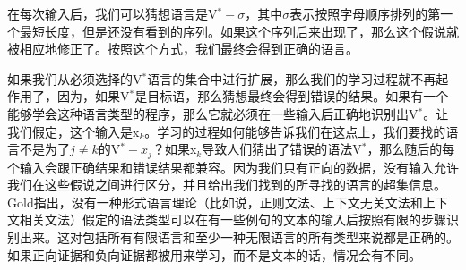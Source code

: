 \noindent
在每次输入后，我们可以猜想语言是V$^* - \sigma$，其中$\sigma$表示按照字母顺序排列的第一个最短长度，但是还没有看到的序列。如果这个序列后来出现了，那么这个假说就被相应地修正了。按照这个方式，我们最终会得到正确的语言。

如果我们从必须选择的V$^*$语言的集合中进行扩展，那么我们的学习过程就不再起作用了，因为，如果V$^*$是目标语，那么猜想最终会得到错误的结果。如果有一个能够学会这种语言类型的程序，那么它就必须在一些输入后正确地识别出V$^*$。让我们假定，这个输入是x$_k$。学习的过程如何能够告诉我们在这点上，我们要找的语言不是为了$j \neq k$的V$^* - x_j$？如果x$_k$导致人们猜出了错误的语法V$^*$，那么随后的每个输入会跟正确结果和错误结果都兼容。因为我们只有正向的数据，没有输入允许我们在这些假说之间进行区分，并且给出我们找到的所寻找的语言的超集信息。Gold指出，没有一种形式语言理论（比如说，正则文法、上下文无关文法和上下文相关文法）假定的语法类型可以在有一些例句的文本的输入后按照有限的步骤识别出来。这对包括所有有限语言和至少一种无限语言的所有类型来说都是正确的。如果正向证据和负向证据都被用来学习，而不是文本的话，情况会有不同。

